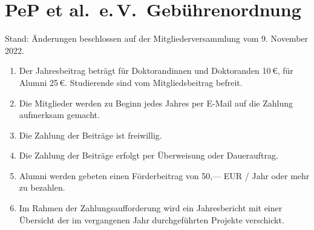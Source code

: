 \documentclass[
	fontsize=12pt,
	paper=a4,
	DIV=14,
	parskip,
]{scrartcl}
\begin{document}
\section*{PeP et al.\ e.\,V.\ Gebührenordnung}

Stand: Änderungen beschlossen auf der Mitgliederversammlung vom 9. November 2022.

\begin{enumerate}[label=(\arabic*)]
	\item Der Jahresbeitrag beträgt für Doktorandinnen und Doktoranden 10\,€, für Alumni 25\,€.
    Studierende sind vom Mitgliedsbeitrag befreit.
	\item Die Mitglieder werden zu Beginn jedes Jahres per E-Mail auf die Zahlung aufmerksam gemacht.
	\item Die Zahlung der Beiträge ist freiwillig.
	\item Die Zahlung der Beiträge erfolgt per Überweisung oder Dauerauftrag.
	\item Alumni werden gebeten einen Förderbeitrag von 50,— EUR / Jahr oder mehr zu bezahlen.
	\item Im Rahmen der Zahlungsaufforderung wird ein Jahresbericht mit einer
		Übersicht der im vergangenen Jahr durchgeführten Projekte verschickt.
\end{enumerate}
\end{document}
